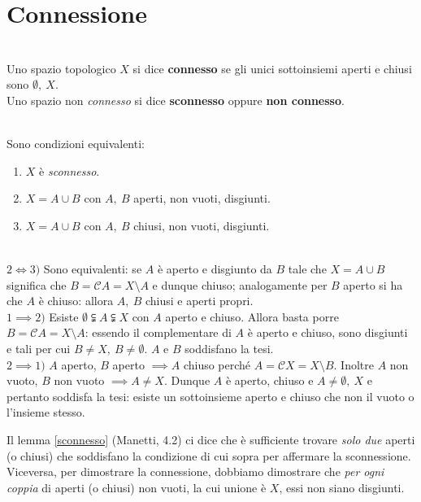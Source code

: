 \section{Connessione}
\begin{define}~{}\\
Uno spazio topologico $X$ si dice \textbf{connesso} se gli unici sottoinsiemi aperti e chiusi sono $\emptyset,\ X$.\\
Uno spazio non \textit{connesso} si dice \textbf{sconnesso} oppure \textbf{non connesso}.
\end{define}
\begin{lemming}~{}\label{sconnesso}\\
Sono condizioni equivalenti:
\begin{enumerate}
	\item $X$ è \textit{sconnesso}.
	\item $X=A\cup B$ con $A,\ B$ aperti, non vuoti, disgiunti.
	\item $X=A\cup B$ con $A,\ B$ chiusi, non vuoti, disgiunti.
\end{enumerate}
\vspace{-3mm}
\end{lemming}
\begin{demonstration}~{}\\
$2\iff3)$ Sono equivalenti: se $A$ è aperto e disgiunto da $B$ tale che $X=A\cup B$ significa che $B=\mathcal{C}A=X\setminus A$ e dunque chiuso; analogamente per $B$ aperto si ha che $A$ è chiuso: allora $A,\ B$ chiusi e aperti propri.\\
$1\implies2)$ Esiste $\emptyset\subsetneqq A \subsetneqq X$ con $A$ aperto e chiuso. Allora basta porre $B=\mathcal{C}A=X\setminus A$: essendo il complementare di $A$ è aperto e chiuso, sono disgiunti e tali per cui $B\neq X,\ B\neq \emptyset$. $A$ e $B$ soddisfano la tesi.\\
$2\implies1)$ $A$ aperto, $B$ aperto $\implies A$ chiuso perché $A=\mathcal{C}X=X\setminus B$. Inoltre $A$ non vuoto, $B$ non vuoto $\implies A\neq X$. Dunque $A$ è aperto, chiuso e $A\neq \emptyset,\ X$ e pertanto soddisfa la tesi: esiste un sottoinsieme aperto e chiuso che non il vuoto o l'insieme stesso.
\end{demonstration}
\begin{tips}
	Il lemma \ref{sconnesso} (Manetti, 4.2) ci dice che è sufficiente trovare \textit{solo due} aperti (o chiusi) che soddisfano la condizione di cui sopra per affermare la sconnessione. Viceversa, per dimostrare la connessione, dobbiamo dimostrare che \textit{per ogni coppia} di aperti (o chiusi) non vuoti, la cui unione è $X$, essi non siano disgiunti.
\end{tips}
